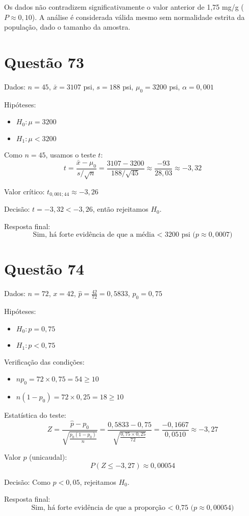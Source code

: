 \documentclass[12pt]{article}
\newcommand{\quest}[1]{\section*{Questão #1}} %
\begin{document}
Os dados não contradizem significativamente o valor anterior de 1,75 mg/g (\(P \approx 0,10\)).  
A análise é considerada válida mesmo sem normalidade estrita da população, dado o tamanho da amostra.


\quest{73}

Dados: $n = 45$, $\bar{x} = 3107$ psi, $s = 188$ psi, $\mu_0 = 3200$ psi, $\alpha = 0{,}001$

Hipóteses:
\begin{itemize}
  \item $H_0: \mu = 3200$
  \item $H_1: \mu < 3200$
\end{itemize}

Como $n = 45$, usamos o teste $t$:
\[
t = \frac{\bar{x} - \mu_0}{s / \sqrt{n}} = \frac{3107 - 3200}{188 / \sqrt{45}} \approx \frac{-93}{28{,}03} \approx -3{,}32
\]

Valor crítico: $t_{0{,}001; 44} \approx -3{,}26$

Decisão: $t = -3{,}32 < -3{,}26$, então rejeitamos $H_0$.

Resposta final:
\[
\boxed{\text{Sim, h\'a forte evid\^encia de que a m\'edia < 3200 psi ($p \approx 0{,}0007$)}}
\]

\quest{74}

Dados: $n = 72$, $x = 42$, $\hat{p} = \frac{42}{72} = 0{,}5833$, $p_0 = 0{,}75$

Hipóteses:
\begin{itemize}
  \item $H_0: p = 0{,}75$
  \item $H_1: p < 0{,}75$
\end{itemize}

Verificação das condições:
\begin{itemize}
  \item $np_0 = 72 \times 0{,}75 = 54 \geq 10$
  \item $n(1 - p_0) = 72 \times 0{,}25 = 18 \geq 10$
\end{itemize}

Estatística do teste:
\[
Z = \frac{\hat{p} - p_0}{\sqrt{\frac{p_0(1 - p_0)}{n}}} = \frac{0{,}5833 - 0{,}75}{\sqrt{\frac{0{,}75 \times 0{,}25}{72}}} = \frac{-0{,}1667}{0{,}0510} \approx -3{,}27
\]

Valor $p$ (unicaudal):
\[
P(Z \leq -3{,}27) \approx 0{,}00054
\]

Decisão: Como $p < 0{,}05$, rejeitamos $H_0$.

Resposta final:
\[
\boxed{\text{Sim, h\'a forte evid\^encia de que a propor\c{c}\~ao < 0{,}75 ($p \approx 0{,}00054$)}}
\]
\end{document}

